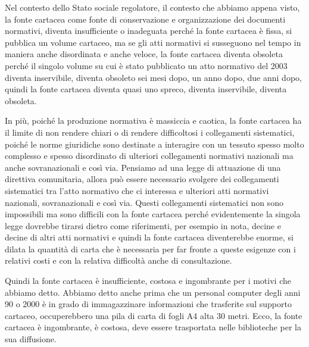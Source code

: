 Nel contesto dello Stato sociale regolatore, il contesto che abbiamo appena visto, la fonte cartacea come fonte di conservazione e organizzazione dei documenti normativi, diventa insufficiente o inadeguata perché la fonte cartacea è fissa, si pubblica un volume cartaceo, ma se gli atti normativi si susseguono nel tempo in maniera anche disordinata e anche veloce, la fonte cartacea diventa obsoleta perché il singolo volume su cui è stato pubblicato un atto normativo del 2003 diventa inservibile, diventa obsoleto sei mesi dopo, un anno dopo, due anni dopo, quindi la fonte cartacea diventa quasi uno spreco, diventa inservibile, diventa obsoleta.
\par
In più, poiché la produzione normativa è massiccia e caotica, la fonte cartacea ha il limite di non rendere chiari o di rendere difficoltosi i collegamenti sistematici, poiché le norme giuridiche sono destinate a interagire con un tessuto spesso molto complesso e spesso disordinato di ulteriori collegamenti normativi nazionali ma anche sovranazionali e così via. Pensiamo ad una legge di attuazione di una direttiva comunitaria, allora può essere necessario svolgere dei collegamenti sistematici tra l'atto normativo che ci interessa e ulteriori atti normativi nazionali, sovranazionali e così via. Questi collegamenti sistematici non sono impossibili ma sono difficili con la fonte cartacea perché evidentemente la singola legge dovrebbe tirarsi dietro come riferimenti, per esempio in nota, decine e decine di altri atti normativi e quindi la fonte cartacea diventerebbe enorme, si dilata la quantità di carta che è necessaria per far fronte a queste esigenze con i relativi costi e con la relativa difficoltà anche di consultazione.\par 

Quindi la fonte cartacea è insufficiente, costosa e ingombrante per i motivi che abbiamo detto. Abbiamo detto anche prima che un personal computer degli anni 90 o 2000 è in grado di immagazzinare informazioni che trasferite sul supporto cartaceo, occuperebbero una pila di carta di fogli A4 alta 30 metri. Ecco, la fonte cartacea è ingombrante, è costosa, deve essere trasportata nelle biblioteche per la sua diffusione.\par 

